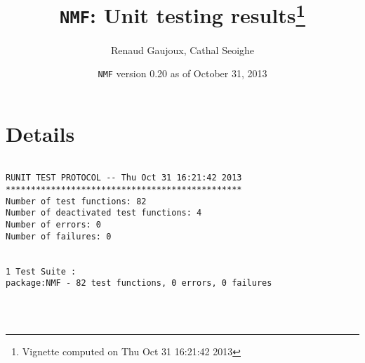 \documentclass[10pt]{article}\usepackage[]{graphicx}\usepackage[]{color}
\author{Renaud Gaujoux, Cathal Seoighe}
\title{\texttt{NMF}: Unit testing results\footnote{Vignette computed  on Thu Oct 31 16:21:42 2013}}
\date{\texttt{NMF} version 0.20 as of October 31, 2013}
\begin{document}
\maketitle

\section{Details}
\begin{verbatim}

RUNIT TEST PROTOCOL -- Thu Oct 31 16:21:42 2013 
*********************************************** 
Number of test functions: 82 
Number of deactivated test functions: 4 
Number of errors: 0 
Number of failures: 0 

 
1 Test Suite : 
package:NMF - 82 test functions, 0 errors, 0 failures




\end{verbatim}
\end{document}
